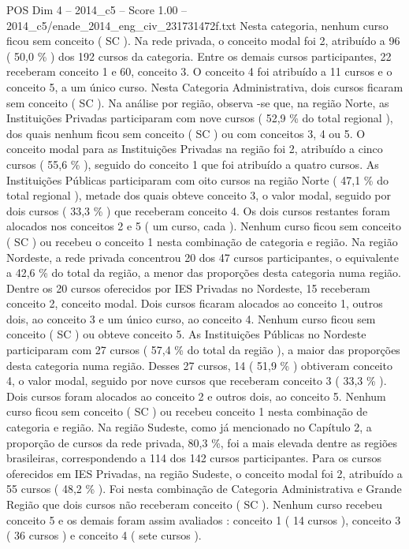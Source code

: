 \begin{textsample}{POS Dim 4 – 2014\_c5 – Score 1.00 – 2014\_c5/enade\_2014\_eng\_civ\_231731472f.txt}
Nesta categoria, nenhum curso ficou sem conceito ( SC ).
Na rede privada, o conceito modal foi 2, atribuído a 96 ( 50,0 \% ) dos 192 cursos da categoria.
Entre os demais cursos participantes, 22 receberam conceito 1 e 60, conceito 3.
O conceito 4 foi atribuído a 11 cursos e o conceito 5, a um único curso.
Nesta Categoria Administrativa, dois cursos ficaram sem conceito ( SC ).
Na análise por região, observa -se que, na região Norte, as Instituições Privadas participaram com nove cursos ( 52,9 \% do total regional ), dos quais nenhum ficou sem conceito ( SC ) ou com conceitos 3, 4 ou 5.
O conceito modal para as Instituições Privadas na região foi 2, atribuído a cinco cursos ( 55,6 \% ), seguido do conceito 1 que foi atribuído a quatro cursos.
As Instituições Públicas participaram com oito cursos na região Norte ( 47,1 \% do total regional ), metade dos quais obteve conceito 3, o valor modal, seguido por dois cursos ( 33,3 \% ) que receberam conceito 4.
Os dois cursos restantes foram alocados nos conceitos 2 e 5 ( um curso, cada ).
Nenhum curso ficou sem conceito ( SC ) ou recebeu o conceito 1 nesta combinação de categoria e região.
Na região Nordeste, a rede privada concentrou 20 dos 47 cursos participantes, o equivalente a 42,6 \% do total da região, a menor das proporções desta categoria numa região.
Dentre os 20 cursos oferecidos por IES Privadas no Nordeste, 15 receberam conceito 2, conceito modal.
Dois cursos ficaram alocados ao conceito 1, outros dois, ao conceito 3 e um único curso, ao conceito 4.
Nenhum curso ficou sem conceito ( SC ) ou obteve conceito 5.
As Instituições Públicas no Nordeste participaram com 27 cursos ( 57,4 \% do total da região ), a maior das proporções desta categoria numa região.
Desses 27 cursos, 14 ( 51,9 \% ) obtiveram conceito 4, o valor modal, seguido por nove cursos que receberam conceito 3 ( 33,3 \% ).
Dois cursos foram alocados ao conceito 2 e outros dois, ao conceito 5.
Nenhum curso ficou sem conceito ( SC ) ou recebeu conceito 1 nesta combinação de categoria e região.
Na região Sudeste, como já mencionado no Capítulo 2, a proporção de cursos da rede privada, 80,3 \%, foi a mais elevada dentre as regiões brasileiras, correspondendo a 114 dos 142 cursos participantes.
Para os cursos oferecidos em IES Privadas, na região Sudeste, o conceito modal foi 2, atribuído a 55 cursos ( 48,2 \% ).
Foi nesta combinação de Categoria Administrativa e Grande Região que dois cursos não receberam conceito ( SC ).
Nenhum curso recebeu conceito 5 e os demais foram assim avaliados : conceito 1 ( 14 cursos ), conceito 3 ( 36 cursos ) e conceito 4 ( sete cursos ).

\end{textsample}
